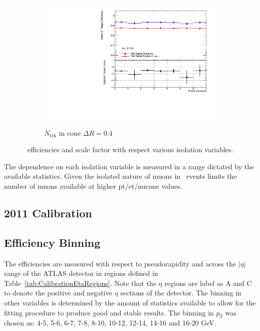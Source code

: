 \begin{figure}[phtb]
    \begin{subfigure}[b]{0.55\textwidth}
      \includegraphics[width=\textwidth]{PartCalibration2012/Plots/SFPlots/nucone40_smt.pdf}
      \caption{$N_{\textrm{trk}}$ in cone $\Delta R=0.4$} \label{fig:CalibrationIsoNucone40}
    \end{subfigure}
  \caption{\xsd\ efficiencies and scale factor with respect various isolation variables.} \label{fig:CalibrationIsoNucone}
\end{figure}

The dependence on each isolation variable is measured in a range dictated by the available statistics. Given the isolated nature of muons in \jpsi\ events limits the number of muons available at higher pt/et/nucone values.

\subsection{2011 Calibration}


\subsection{Efficiency Binning}

The efficiencies are measured with respect to pseudorapidity and across the $|\eta|$ range of the ATLAS detector in regions defined in Table~\ref{tab:CalibrationEtaRegions}. Note that the $\eta$ regions are label as A and C to denote the positive and negative $\eta$ sections of the detector. The binning in other variables is determined by the amount of statistics available to allow for the fitting procedure to produce good and stable results. The binning in $p_{T}$ was chosen as: 4-5, 5-6, 6-7, 7-8, 8-10, 10-12, 12-14, 14-16 and 16-20 GeV.  

